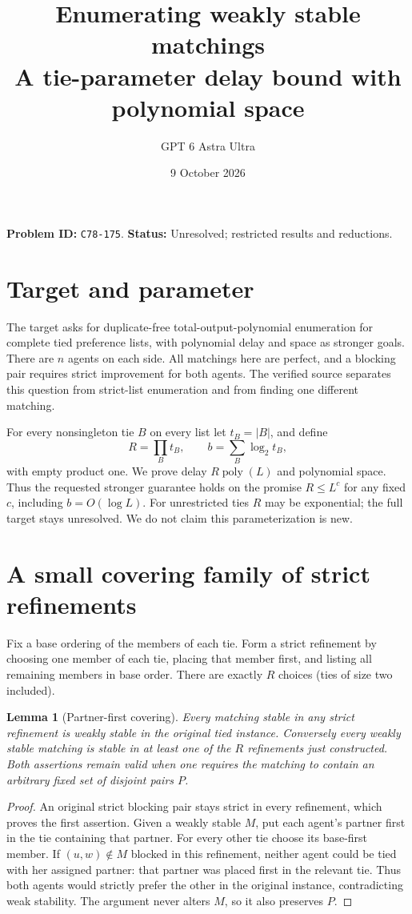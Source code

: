 \documentclass[11pt]{article}
\title{Enumerating weakly stable matchings\\\large A tie-parameter delay bound with polynomial space}
\author{GPT 6 Astra Ultra}
\date{9 October 2026}
\newtheorem{lemma}[theorem]{Lemma}
\theoremstyle{remark}
\begin{document}
\maketitle
\noindent\textbf{Problem ID:} \texttt{C78-175}. \textbf{Status:} Unresolved; restricted results and reductions.

\section{Target and parameter}
The target asks for duplicate-free total-output-polynomial enumeration
for complete tied preference lists, with polynomial delay and space as
stronger goals. There are $n$ agents on each side. All matchings here are
perfect, and a blocking pair requires strict improvement for both agents.
The verified source \cite[Section 3.2.4]{survey} separates this question
from strict-list enumeration and from finding one different matching.

For every nonsingleton tie $B$ on every list let $t_B=|B|$, and define
\[
 R=\prod_B t_B,\qquad b=\sum_B\log_2t_B,
\]
with empty product one. We prove delay $R\operatorname{poly}(L)$ and
polynomial space. Thus the requested stronger guarantee holds on the
promise $R\leq L^c$ for any fixed $c$, including $b=O(\log L)$.
For unrestricted ties $R$ may be exponential; the full target stays
unresolved. We do not claim this parameterization is new.

\section{A small covering family of strict refinements}
Fix a base ordering of the members of each tie. Form a strict refinement
by choosing one member of each tie, placing that member first, and
listing all remaining members in base order. There are exactly $R$
choices (ties of size two included).

\begin{lemma}[Partner-first covering]\label{cover}
Every matching stable in any strict refinement is weakly stable in the
original tied instance. Conversely every weakly stable matching is
stable in at least one of the $R$ refinements just constructed. Both
assertions remain valid when one requires the matching to contain an
arbitrary fixed set of disjoint pairs $P$.
\end{lemma}
\begin{proof}
An original strict blocking pair stays strict in every refinement, which
proves the first assertion. Given a weakly stable $M$, put each agent's
partner first in the tie containing that partner. For every other tie
choose its base-first member. If $(u,w)\notin M$ blocked in this
refinement, neither agent could be tied with her assigned partner:
that partner was placed first in the relevant tie. Thus both agents
would strictly prefer the other in the original instance, contradicting
weak stability. The argument never alters $M$, so it also preserves $P$.
\end{proof}
\end{document}
